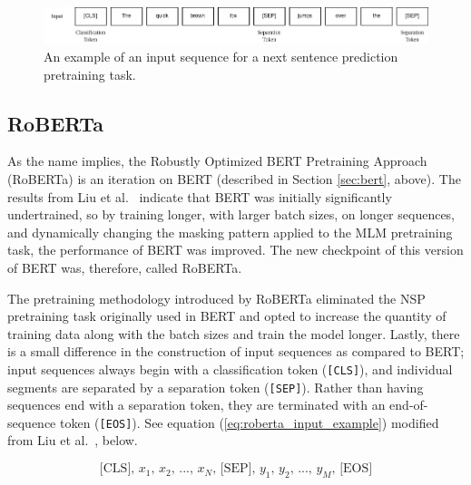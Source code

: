 \documentclass[12pt]{article}
\begin{document}
\begin{figure}[!t]
    \includegraphics[width=\linewidth]{figures/BERT_NSP_input.png}
    \caption{An example of an input sequence for a next sentence prediction pretraining task.}
    \label{fig:bert_nsp_input_example}
\end{figure}

\subsection{RoBERTa}\label{sec:roberta}
As the name implies, the Robustly Optimized BERT Pretraining Approach (RoBERTa) is an iteration on BERT (described in Section \ref{sec:bert}, above). The results from Liu et al.~\cite{liu_roberta_2019} indicate that BERT was initially significantly undertrained, so by training longer, with larger batch sizes, on longer sequences, and dynamically changing the masking pattern applied to the MLM pretraining task, the performance of BERT was improved. The new checkpoint of this version of BERT was, therefore, called RoBERTa.

The pretraining methodology introduced by RoBERTa eliminated the NSP pretraining task originally used in BERT and opted to increase the quantity of training data along with the batch sizes and train the model longer. Lastly, there is a small difference in the construction of input sequences as compared to BERT; input sequences always begin with a classification token (\lstinline|[CLS]|), and individual segments are separated by a separation token (\lstinline|[SEP]|). Rather than having sequences end with a separation token, they are terminated with an end-of-sequence token (\lstinline|[EOS]|). See equation (\ref{eq:roberta_input_example}) modified from Liu et al.~\cite{liu_roberta_2019}, below.

\begin{equation}\label{eq:roberta_input_example}
    \mbox{[CLS], $x_1$, $x_2$, ..., $x_N$, [SEP], $y_1$, $y_2$, ..., $y_M$, [EOS]}
\end{equation}
\end{document}

